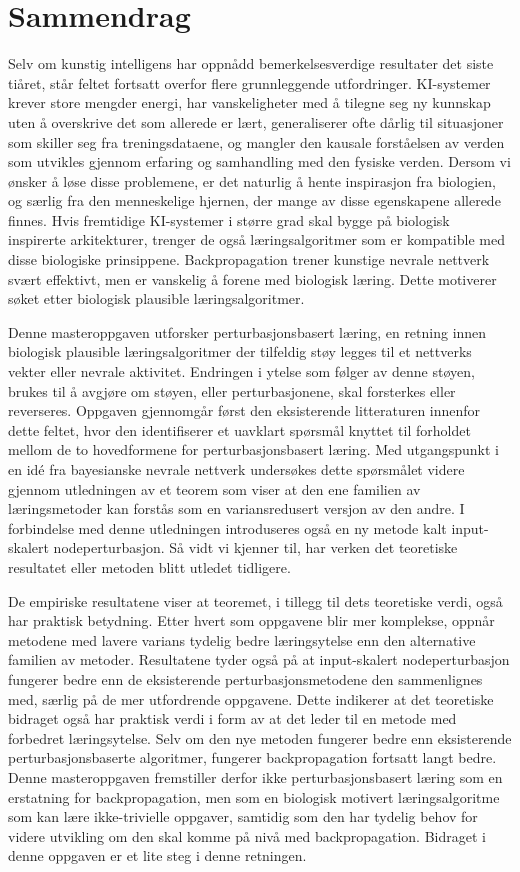 \section*{Sammendrag}
Selv om kunstig intelligens har oppnådd bemerkelsesverdige resultater det siste tiåret, står feltet fortsatt overfor flere grunnleggende utfordringer. KI-systemer krever store mengder energi, har vanskeligheter med å tilegne seg ny kunnskap uten å overskrive det som allerede er lært, generaliserer ofte dårlig til situasjoner som skiller seg fra treningsdataene, og mangler den kausale forståelsen av verden som utvikles gjennom erfaring og samhandling med den fysiske verden. Dersom vi ønsker å løse disse problemene, er det naturlig å hente inspirasjon fra biologien, og særlig fra den menneskelige hjernen, der mange av disse egenskapene allerede finnes. Hvis fremtidige KI-systemer i større grad skal bygge på biologisk inspirerte arkitekturer, trenger de også læringsalgoritmer som er kompatible med disse biologiske prinsippene. Backpropagation trener kunstige nevrale nettverk svært effektivt, men er vanskelig å forene med biologisk læring. Dette motiverer søket etter biologisk plausible læringsalgoritmer.

Denne masteroppgaven utforsker perturbasjonsbasert læring, en retning innen biologisk plausible læringsalgoritmer der tilfeldig støy legges til et nettverks vekter eller nevrale aktivitet. Endringen i ytelse som følger av denne støyen, brukes til å avgjøre om støyen, eller perturbasjonene, skal forsterkes eller reverseres. Oppgaven gjennomgår først den eksisterende litteraturen innenfor dette feltet, hvor den identifiserer et uavklart spørsmål knyttet til forholdet mellom de to hovedformene for perturbasjonsbasert læring. Med utgangspunkt i en idé fra bayesianske nevrale nettverk undersøkes dette spørsmålet videre gjennom utledningen av et teorem som viser at den ene familien av læringsmetoder kan forstås som en variansredusert versjon av den andre. I forbindelse med denne utledningen introduseres også en ny metode kalt input-skalert nodeperturbasjon. Så vidt vi kjenner til, har verken det teoretiske resultatet eller metoden blitt utledet tidligere.

De empiriske resultatene viser at teoremet, i tillegg til dets teoretiske verdi, også har praktisk betydning. Etter hvert som oppgavene blir mer komplekse, oppnår metodene med lavere varians tydelig bedre læringsytelse enn den alternative familien av metoder. Resultatene tyder også på at input-skalert nodeperturbasjon fungerer bedre enn de eksisterende perturbasjonsmetodene den sammenlignes med, særlig på de mer utfordrende oppgavene. Dette indikerer at det teoretiske bidraget også har praktisk verdi i form av at det leder til en metode med forbedret læringsytelse. Selv om den nye metoden fungerer bedre enn eksisterende perturbasjonsbaserte algoritmer, fungerer backpropagation fortsatt langt bedre. Denne masteroppgaven fremstiller derfor ikke perturbasjonsbasert læring som en erstatning for backpropagation, men som en biologisk motivert læringsalgoritme som kan lære ikke-trivielle oppgaver, samtidig som den har tydelig behov for videre utvikling om den skal komme på nivå med backpropagation. Bidraget i denne oppgaven er et lite steg i denne retningen.
\clearpage
